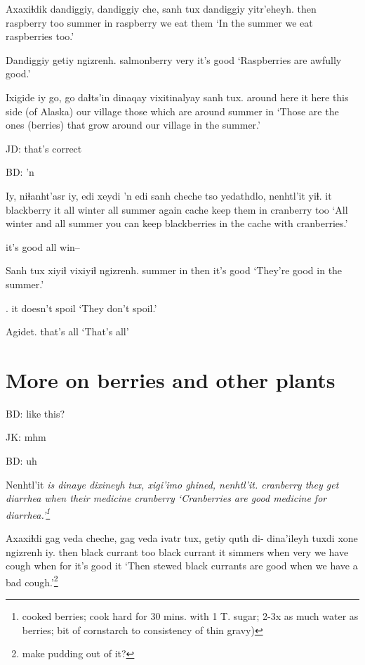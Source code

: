 \documentclass[12pt]{article}
\begin{document}
\gll Axaxiɬdik {dandiggiy, dandiggiy} che, sanh tux dandiggiy yitr'eheyh.
then      raspberry          too  summer in raspberry {we eat them}
\glt `In the summer we eat raspberries too.'
\glend

\gll Dandiggiy getiy ngizrenh.
salmonberry very {it's good}
\glt `Raspberries are awfully good.'
\glend

\gll Ixigide iy go, {go                  daɬts'in}               dinaqay vixitinalyay sanh tux.
{around here} it here {this side (of Alaska)} {our village} {those which are around} summer in
\glt `Those are the ones (berries) that grow around our village in the summer.'
\glend

JD:  that's correct

BD:  'n

\gll Iy, niɬanht'asr iy, edi xeydi 'n edi sanh cheche tso yedathdlo, nenhtl'it yiɬ.
it  blackberry it all winter {} all summer again cache {keep them in} cranberry too
\glt `All winter and all summer you can keep blackberries in the cache with cranberries.'
\glend 

it's good all win--

\gll Sanh tux xiyiɬ vixiyiɬ ngizrenh. 
summer in then {} {it's good} 
\glt `They're good in the summer.'
\glend

.
{{it doesn't spoil}}
\glt `They don't spoil.'
\glend

\gll Agidet.
{{that's all}}
\glt `That's all'
\glend

\section{More on berries and other plants}

BD:  like this?

JK:  mhm

BD:  uh

\gll Nenhtl'it \em{is} {dinaye dixineyh} tux, {xigi'imo ghined,} nenhtl'it.
cranberry {} {they get diarrhea}  when {their medicine} cranberry
\glt `Cranberries are good medicine for diarrhea.'\footnote{cooked berries; cook hard for 30 mins. with 1 T. sugar; 2-3x as much water as berries; bit of cornstarch to consistency of thin gravy)}
\glend

\gll Axaxiɬdi {gag veda} cheche, {gag veda} ivatr tux, getiy                {quth di- dina'ileyh} tuxdi xone ngizrenh iy.
then    {black currant} too {black currant} {it simmers} when very {we have cough} when for {it's good} it
\glt `Then stewed black currants are good when we have a bad cough.'\footnote{make pudding out of it?}
\glend
\end{document}
